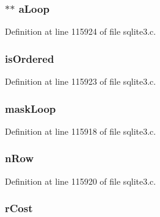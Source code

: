 \subsubsection[{a\+Loop}]{$\ast$$\ast$ a\+Loop}\label{struct_where_path_a291ccde6c9d7d9d841fd5559254c5e12}


Definition at line 115924 of file sqlite3.\+c.

\hypertarget{struct_where_path_af9174dc8e7056e94c539611eeb036d8d}{}
\subsubsection[{is\+Ordered}]{ is\+Ordered}\label{struct_where_path_af9174dc8e7056e94c539611eeb036d8d}


Definition at line 115923 of file sqlite3.\+c.

\hypertarget{struct_where_path_a911f96b00bf431e028e1f415b4212fb2}{}
\subsubsection[{mask\+Loop}]{ mask\+Loop}\label{struct_where_path_a911f96b00bf431e028e1f415b4212fb2}


Definition at line 115918 of file sqlite3.\+c.

\hypertarget{struct_where_path_a2e37b751d04e575b291dfdac16e91b5a}{}
\subsubsection[{n\+Row}]{ n\+Row}\label{struct_where_path_a2e37b751d04e575b291dfdac16e91b5a}


Definition at line 115920 of file sqlite3.\+c.

\hypertarget{struct_where_path_ab5f3fd4b1eee3cad50a4540cc2452e7a}{}
\subsubsection[{r\+Cost}]{ r\+Cost}\label{struct_where_path_ab5f3fd4b1eee3cad50a4540cc2452e7a}


